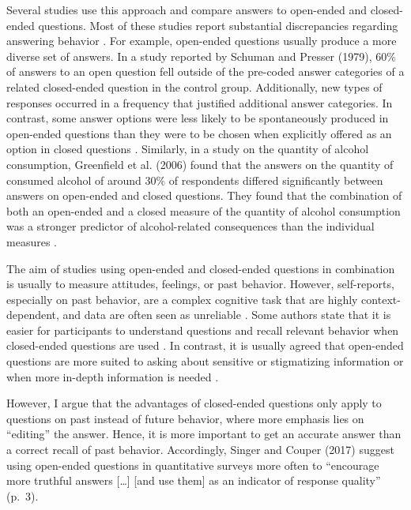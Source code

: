 \documentclass{article}
\begin{document}
Several studies use this approach and compare answers to open-ended and closed-ended questions. Most of these studies report substantial discrepancies regarding answering behavior \parencite{Converse1984, Greenfield2006, Schuman1979, Schwarz1999}. For example, open-ended questions usually produce a more diverse set of answers. In a study reported by Schuman and Presser (1979), 60\% of answers to an open question fell outside of the pre-coded answer categories of a related closed-ended question in the control group. Additionally, new types of responses occurred in a frequency that justified additional answer categories. In contrast, some answer options were less likely to be spontaneously produced in open-ended questions than they were to be chosen when explicitly offered as an option in closed questions \parencite[pp. 365][]{Schuman1979}. Similarly, in a study on the quantity of alcohol consumption, Greenfield et al. (2006) found that the answers on the quantity of consumed alcohol of around 30\% of respondents differed significantly between answers on open-ended and closed questions. They found that the combination of both an open-ended and a closed measure of the quantity of alcohol consumption was a stronger predictor of alcohol-related consequences than the individual measures \parencite{Greenfield2006}.

The aim of studies using open-ended and closed-ended questions in combination is usually to measure attitudes, feelings, or past behavior. However, self-reports, especially on past behavior, are a complex cognitive task that are highly context-dependent, and data are often seen as unreliable \parencite[pp. 128][]{Schwarz2001}. Some authors state that it is easier for participants to understand questions and recall relevant behavior when closed-ended questions are used \parencite[pp. 131][]{Schwarz2001}. In contrast, it is usually agreed that open-ended questions are more suited to asking about sensitive or stigmatizing information or when more in-depth information is needed \parencite{Friborg2013}.

However, I argue that the advantages of closed-ended questions only apply to questions on past instead of future behavior, where more emphasis lies on “editing” the answer. Hence, it is more important to get an accurate answer than a correct recall of past behavior. Accordingly, Singer and Couper (2017) suggest using open-ended questions in quantitative surveys more often to “encourage more truthful answers […] [and use them] as an indicator of response quality” (p. 3).
\end{document}
